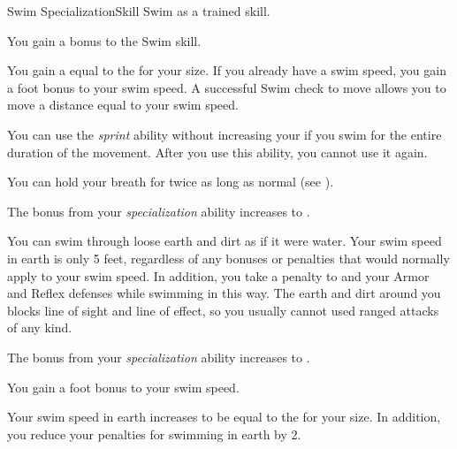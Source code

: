     \begin{feat}{Swim Specialization}{Skill}
        \featpre Swim as a trained skill.

         You gain a  bonus to the Swim skill.

         You gain a  equal to the  for your size.
        If you already have a swim speed, you gain a  foot bonus to your swim speed.
        A successful Swim check to move allows you to move a distance equal to your swim speed.

         You can use the \textit{sprint} ability without increasing your  if you swim for the entire duration of the movement.
        After you use this ability, you  cannot use it again.

         You can hold your breath for twice as long as normal (see ).

         The bonus from your \textit{specialization} ability increases to .

         You can swim through loose earth and dirt as if it were water.
        Your swim speed in earth is only 5 feet, regardless of any bonuses or penalties that would normally apply to your swim speed.
        In addition, you take a  penalty to  and your Armor and Reflex defenses while swimming in this way.
        The earth and dirt around you blocks line of sight and line of effect, so you usually cannot used ranged attacks of any kind.

         The bonus from your \textit{specialization} ability increases to .

         You gain a  foot bonus to your swim speed.

         Your swim speed in earth increases to be equal to the  for your size.
        In addition, you reduce your penalties for swimming in earth by 2.
    \end{feat}

